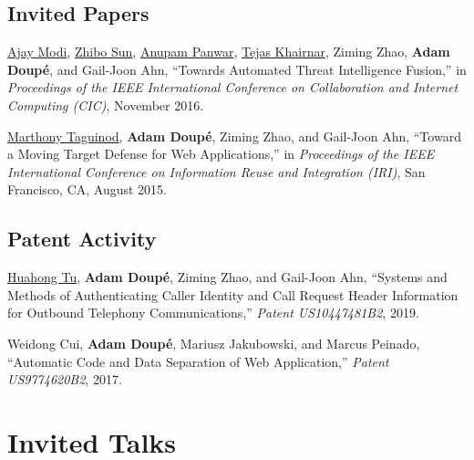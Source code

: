\documentclass[11pt,letterpaper,sans]{moderncv}
\begin{document}
\subsection{Invited Papers}

\begin{etaremune}

\item \underline{Ajay Modi}, \underline{Zhibo Sun}, \underline{Anupam
  Panwar}, \underline{Tejas Khairnar}, Ziming Zhao, \textbf{Adam
  Doup\'e}, and Gail-Joon Ahn, ``Towards Automated Threat Intelligence
  Fusion,'' in \emph{Proceedings of the IEEE International Conference
    on Collaboration and Internet Computing (CIC)}, November 2016.

\item \underline{Marthony Taguinod}, \textbf{Adam Doup\'e}, Ziming
  Zhao, and Gail-Joon Ahn, ``Toward a Moving Target Defense for Web
  Applications,'' in \emph{Proceedings of the IEEE International
    Conference on Information Reuse and Integration (IRI)}, San
  Francisco, CA, August 2015.
\end{etaremune}

\subsection{Patent Activity}

\begin{etaremune}

  \item \underline{Huahong Tu}, \textbf{Adam Doup\'e}, Ziming Zhao,
    and Gail-Joon Ahn, ``Systems and Methods of Authenticating Caller
    Identity and Call Request Header Information for Outbound
    Telephony Communications,'' \emph{Patent US10447481B2}, 2019.

  \item Weidong Cui, \textbf{Adam Doup\'e}, Mariusz Jakubowski, and Marcus
    Peinado, ``Automatic Code and Data Separation of Web
    Application,'' \emph{Patent US9774620B2}, 2017. 
  
\end{etaremune}

\section{Invited Talks}
\end{document}
